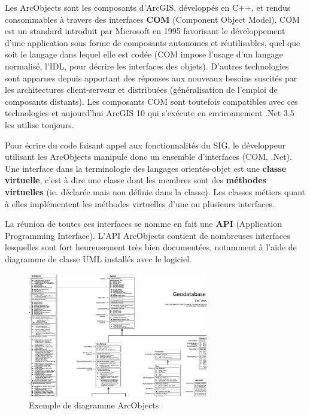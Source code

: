 \documentclass[11pt]{article}
\begin{document}
Les ArcObjects sont les composants d'ArcGIS, développés en C++, et rendus consommables à travers des interfaces \textbf{COM} (Component Object Model). COM est un standard introduit par Microsoft en 1995 favorisant le développement d’une application sous forme de composants autonomes et réutilisables, quel que soit le langage dans lequel elle est codée (COM impose l’usage d’un langage normalisé, l'IDL, pour décrire les interfaces des objets). D’autres technologies sont apparues depuis apportant des réponses aux nouveaux besoins suscités par les architectures client-serveur et distribuées (généralisation de l’emploi de composants distants). Les composants COM sont toutefois compatibles avec ces technologies et aujourd’hui ArcGIS 10 qui s’exécute en environnement .Net 3.5 les utilise toujours.

Pour écrire du code faisant appel aux fonctionnalités du SIG, le développeur utilisant les ArcObjects manipule donc un ensemble d'interfaces (COM, .Net). Une interface dans la terminologie des langages orientés-objet est une \textbf{classe virtuelle}, c'est à dire une classe dont les membres sont des \textbf{méthodes virtuelles} (ie. déclarée mais non définie dans la classe). Les classes métiers quant à elles implémentent les méthodes virtuelles d'une ou plusieurs interfaces.

La réunion de toutes ces interfaces se nomme en fait une \textbf{API} (Application Programming Interface). L'API ArcObjects contient de nombreuses interfaces lesquelles sont fort heureusement très bien documentées, notamment à l'aide de diagramme de classe UML installés avec le logiciel.

\begin{figure}[!h]
	\center \includegraphics[width=0.70\textwidth]{img/cours/api_arcobjects.png}
	\caption{Exemple de diagramme ArcObjects}
\end{figure}
\end{document}

